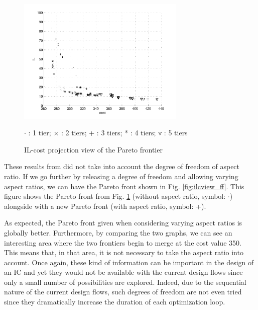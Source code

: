 \begin{figure}[h!]
\begin{center}
\includegraphics[width=8cm]{ultiplot1.pdf}
\end{center}
\vspace{-0.5cm}
\caption{IL-cost projection view of the Pareto frontier}
\begin{center}
\begin{scriptsize}
$\cdot$ : 1 tier; $\times$ : 2 tiers; + : 3 tiers; * : 4 tiers; $\triangledown$ : 5 tiers\\
\end{scriptsize}
\end{center}
\label{fig:ilcview}
\end{figure}

These results from did not take into account the degree of freedom of aspect ratio. If we go further by releasing a degree of freedom and allowing varying aspect ratios, we can have the Pareto front shown in Fig. \ref{fig:ilcview_ff}. This figure shows the Pareto front from Fig. \ref{fig:ilcview} (without aspect ratio, symbol: $\cdot$) alongside with a new Pareto front (with aspect ratio, symbol: +).

As expected, the Pareto front given when considering varying aspect ratios is globally better. Furthermore, by comparing the two graphs, we can see an interesting area where the two frontiers begin to merge at the cost value 350. This means that, in that area, it is not necessary to take the aspect ratio into account. Once again, these kind of information can be important in the design of an IC and yet they would not be available with the current design flows since only a small number of possibilities are explored. Indeed, due to the sequential nature of the current design flows, such degrees of freedom are not even tried since they dramatically increase the duration of each optimization loop.

